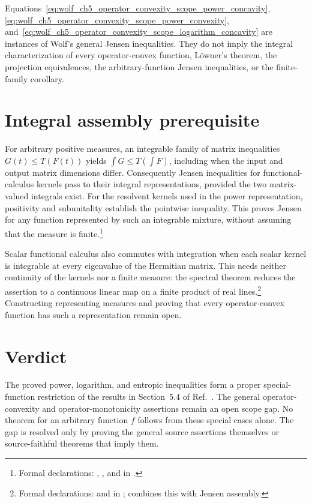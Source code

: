 \documentclass{article}
\begin{document}
Equations~\ref{eq:wolf_ch5_operator_convexity_scope_power_concavity},
\ref{eq:wolf_ch5_operator_convexity_scope_power_convexity},
and~\ref{eq:wolf_ch5_operator_convexity_scope_logarithm_concavity} are
instances of Wolf's general Jensen inequalities. They do not imply the
integral characterization of every operator-convex function, L\"owner's
theorem, the projection equivalences, the arbitrary-function Jensen
inequalities, or the finite-family corollary.

\section{Integral assembly prerequisite}

For arbitrary positive measures, an integrable family of matrix inequalities
$G(t)\leq T(F(t))$ yields $\int G\leq T(\int F)$, including when the input
and output matrix dimensions differ. Consequently Jensen inequalities for
functional-calculus kernels pass to their integral representations, provided
the two matrix-valued integrals exist. For the resolvent kernels used in the
power representation, positivity and subunitality establish the pointwise
inequality. This proves Jensen for any function represented by such an
integrable mixture, without assuming that the measure is finite.\footnote{
Formal declarations: ,
, and
 in
.}

Scalar functional calculus also commutes with integration when each scalar
kernel is integrable at every eigenvalue of the Hermitian matrix. This needs
neither continuity of the kernels nor a finite measure: the spectral theorem
reduces the assertion to a continuous linear map on a finite product of real
lines.\footnote{Formal declarations:
 and
 in
;
 combines this with Jensen assembly.}
Constructing representing measures and proving that every operator-convex
function has such a representation remain open.

\section{Verdict}

The proved power, logarithm, and entropic inequalities form a proper special-function
restriction of the results in Section~5.4 of Ref.~\cite{Wolf2012Quantum}. The
general operator-convexity and operator-monotonicity assertions remain an open
scope gap. No theorem for an arbitrary function $f$ follows from these
special cases alone. The gap is resolved only by proving the general source
assertions themselves or source-faithful theorems that imply them.



\end{document}
